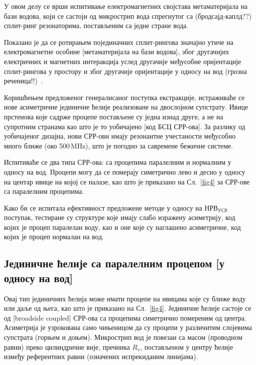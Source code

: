 У овом делу се врши испитивање електромагнетних својстава метаматеријала на бази водова, који се састоји од микрострип вода спрегнутог са (бродсајд-каплд??) сплит-ринг резонаторима, постављеним са једне стране вода.

Показано је да се ротирањем појединачних сплит-рингова значајно утиче на електромагнетне особине [метаматеријала на бази водова], због другачијих електричних и магнетних интеракција услед другачије међусобне оријентације сплит-рингова у простору и због другачије оријентације у односу на вод (грозна реченица!!)~\cite{stereo,bib9}.

Коришћењем предложеног генералисаног поступка екстракције, истраживаће се нове асиметричне јединичне ћелије реализоване на двослојном супстрату. Ивице прстенова које садрже процепе постављене су једна изнад друге, а не на супротним странама као што је то уобичајено [код БСЦ СРР-ова]. За разлику од уобичајеног дизајна, нови СРР-ови имају резонантне учестаности међусобно много ближе (око 500\,MHz), што је погодно за савремене бежичне системе.

Испитиваће се два типа СРР-ова: са процепима паралелним и нормалним у односу на вод. Процепи могу да се померају симетрично лево и десно у односу на центар ивице на којој се налазе, као што је приказано на Сл.~\ref{fig4} за СРР-ове са паралелним процепима.

Како би се испитала ефективност предложене методе у односу на $НРВ_{УСР.}$ поступак, тестиране су структуре које имају слабо изражену асиметрију, код којих је процеп паралелан воду, као и оне које су наглашено асиметричне, код којих је процеп нормалан на вод.

\subsection{Јединичне ћелије са паралелним процепом [у односу на вод]}

Овај тип јединичних ћелија може имати процепе на ивицама које су ближе воду или даље од њега, као што је приказано на Сл.~\ref{fig4}. Јединичне ћелије састоје се од [broadside coupled] СРР-ова са процепима симетрично помереним од центра. Асиметрија је узрокована само чињеницом да су процепи у различитим слојевима супстрата (горњем и доњем). Микрострип вод је повезан са масом (проводном равни) преко цилиндричне вије, пречника $R_v$, постављеном у центру ћелије између референтних равни (означених испрекиданим линијама).

